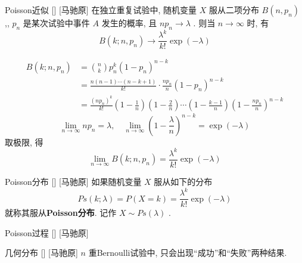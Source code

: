 \documentclass[UTF8]{ctexart}
\begin{document}
        \begin{thm}
            []
            {Poisson近似}
            []
            [马驰原]
            在独立重复试验中, 随机变量 \(X\) 服从二项分布 \(B(n,p_n)\) ,,  \(p_n\) 是某次试验中事件 \(A\) 发生的概率, 且 \(np_n\to\lambda \) . 则当 \(n\to\infty\) 时, 有\[B(k;n,p_n)\to\frac{\lambda^k}{k!}\exp (-\lambda) \]
        \end{thm}

        \begin{prf}
            \[
                \begin{aligned}
                    B(k;n,p_n) &= \binom{n}{k}p_n^k(1-p_n)^{n-k}\\
                    &=\frac{n(n-1)\cdots(n-k+1)}{k!}\cdot\frac{np_n}{n}\left(1-p_n \right)^{n-k}\\
                    &=\frac{(np_n)^k}{k!}\left(1-\frac{1}{n} \right)\left(1-\frac{2}{n} \right)\cdots\left(1-\frac{k-1}{n} \right)\left(1-\frac{np_n}{n} \right)^{n-k}        
                \end{aligned}
            \]
            \[\lim_{n\to\infty}np_n=\lambda,\quad\lim_{n\to\infty}\left(1-\frac{\lambda}{n} \right)^{n-k}=\exp(-\lambda) \]
            取极限, 得\[\lim_{n\to\infty} B(k;n,p_n)=\frac{\lambda^k}{k!}\exp (-\lambda) \]
        \end{prf}

        \begin{dfn}
            []
            {Poisson分布}
            []
            [马驰原]
            如果随机变量 \(X\) 服从如下的分布\[Ps(k;\lambda)=P(X=k)=\frac{\lambda^k}{k!}\exp (-\lambda)\]就称其服从\textbf{Poisson分布}. 记作 \(X\sim Ps(\lambda)\) .
        \end{dfn}

        \begin{dfn}
            []
            {Poisson过程}
            []
            [马驰原]
        \end{dfn}

        \begin{dfn}
            []
            {几何分布}
            []
            [马驰原]
             \(n\) 重Bernoulli试验中, 只会出现“成功”和“失败”两种结果. 
        \end{dfn}
\end{document}
